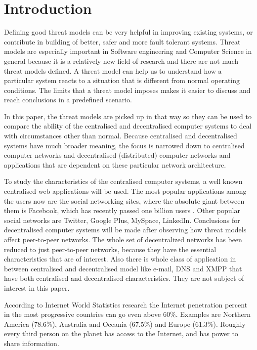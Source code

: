 \section{Introduction}
Defining good threat models can be very helpful in improving existing systems, or contribute in building of better, safer and more fault tolerant systems. Threat models are especially important in Software engineering and Computer Science in general because it is a relatively new field of research and there are not much threat models defined. A threat model can help us to understand how a particular system reacts to a situation that is different from normal operating conditions. The limits that a threat model imposes makes it easier to discuss and reach conclusions in a predefined scenario.

In this paper, the threat models are picked up in that way so they can be used to compare the ability of the centralised and decentralised computer systems to deal with circumstances other than normal. Because centralised and decentralised systems have much broader meaning, the focus is narrowed down to centralised computer networks and decentralised (distributed) computer networks and applications that are dependent on these particular network architecture. 

To study the characteristics of the centralised computer systems, a well known centralised web applications will be used. The most popular applications among the users now are the social networking sites, where the absolute giant between them is Facebook, which has recently passed one billion users \cite{web:facebookpassesbillion}. Other popular social networks are Twitter, Google Plus, MySpace, LinkedIn. Conclusions for decentralised computer systems will be made after observing how threat models affect peer-to-peer networks. The whole set of decentralized networks has been reduced to just peer-to-peer networks, because they have the essential characteristics that are of interest. Also there is whole class of application in between centralised and decentralised model like e-mail, DNS and XMPP that have both centralised and decentralised characteristics. They are not subject of interest in this paper.

According to Internet World Statistics research \cite{web:internetworldstats} the Internet penetration percent in the most progressive countries can go even above 60\%. Examples are Northern America (78.6\%), Australia and Oceania (67.5\%) and Europe (61.3\%). Roughly every third person on the planet has access to the Internet, and has power to share information. 

